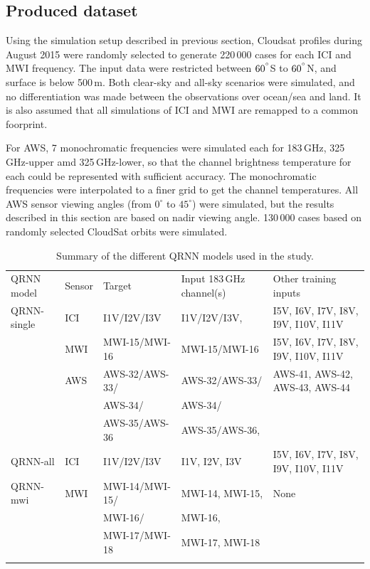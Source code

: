 \documentclass[amt, manuscript]{copernicus}
\begin{document}
\subsection{Produced dataset}
%
Using the simulation setup described in previous section, Cloudsat profiles during August 2015 were randomly selected to generate 220\,000 cases for each ICI and MWI frequency. The input data were restricted between $60^{^{\circ}}$S to $60^{^{\circ}}$N, and surface is below 500\,m. Both clear-sky and all-sky scenarios were simulated, and no differentiation was made between the observations over ocean/sea and land. It is also assumed that all simulations of ICI and MWI are remapped to a common foorprint. 

For AWS, 7 monochromatic frequencies were simulated each for 183\,GHz, 325\,GHz-upper amd 325\,GHz-lower, so that the channel brightness temperature for each could be represented with sufficient accuracy. The monochromatic frequencies were interpolated to a finer grid to get the channel temperatures. All AWS sensor viewing angles (from $0^\circ$ to $45^\circ$) were simulated, but the results described in this section are based on nadir viewing angle. 130\,000 cases based on randomly selected CloudSat orbits were simulated.

\begin{table}[t]
	\caption{Summary of the different QRNN models used in the study.}
	\label{tab:QRNN_models}
	\begin{tabular}{lllll}
		\tophline
		QRNN model & Sensor & Target & Input 183\,GHz channel(s) &Other training inputs \\
		\middlehline
		QRNN-single &  ICI 	& I1V/I2V/I3V 	& I1V/I2V/I3V, & I5V, I6V, I7V, I8V, I9V, I10V, I11V\\
		\cline{2-5}
					&  MWI 	& MWI-15/MWI-16 & MWI-15/MWI-16	& I5V, I6V, I7V, I8V, I9V, I10V, I11V \\
		\cline{2-5}
					& AWS	& AWS-32/AWS-33/ &  AWS-32/AWS-33/ & AWS-41, AWS-42, AWS-43, AWS-44\\
					&		& AWS-34/		 &	AWS-34/		   & \\
					&		& AWS-35/AWS-36	 & AWS-35/AWS-36,  &\\
		\cline{1-5}
		QRNN-all &  ICI 	& I1V/I2V/I3V 	& I1V, I2V, I3V & I5V, I6V, I7V, I8V, I9V, I10V, I11V\\
		\cline{1-5}
		QRNN-mwi &  MWI		& MWI-14/MWI-15/ &  MWI-14, MWI-15, & None 	\\	
				 &			& MWI-16/		 &  MWI-16, & \\
				 &			& MWI-17/MWI-18	 &  MWI-17, MWI-18  &\\					
	\bottomhline
\end{tabular}
\belowtable{} %
\end{table}						
\end{document}
